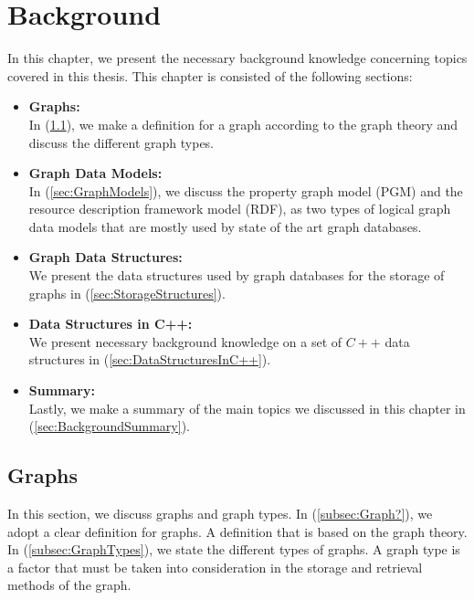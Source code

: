 {\chapter{Background}
\label{chap:Background}

In this chapter, we present the necessary background knowledge concerning topics covered in this thesis. This chapter is consisted of the following sections: 

\begin{itemize}  
\item\textbf{Graphs:}\\
In (\ref{sec:Graphs}), we make a definition for a graph according to the graph theory and discuss the different graph types.

\item \textbf{Graph Data Models:}\\
In (\ref{sec:GraphModels}), we discuss the property graph model (PGM) and the resource description framework model (RDF), as two types of logical graph data models that are mostly used by state of the art graph databases.

\item \textbf{Graph Data Structures:}\\
We present the data structures used by graph databases for the storage of graphs in (\ref{sec:StorageStructures}).

\item \textbf{ Data Structures in C++:}\\
We present necessary background knowledge on a set of $C++$ data structures in (\ref{sec:DataStructuresInC++}).

\item \textbf{Summary:}\\
Lastly, we make a summary of the main topics we discussed in this chapter in (\ref{sec:BackgroundSummary}).
\end{itemize}

\section{Graphs}
\label{sec:Graphs}
In this section, we discuss graphs and graph  types. In (\ref{subsec:Graph?}), we adopt a clear definition for graphs. A definition that is based on the graph theory. In (\ref{subsec:GraphTypes}), we state the different types of graphs. A graph type is a factor that must be taken into consideration in the storage and retrieval methods of the graph.

}
